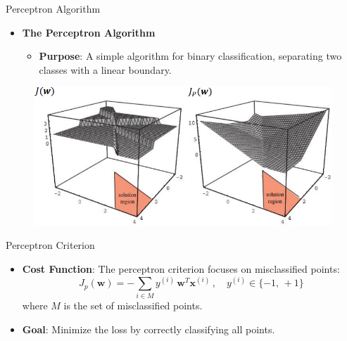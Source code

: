 \documentclass[serif, aspectratio=169]{beamer}
\begin{document}
\begin{frame}{Perceptron Algorithm}
    \begin{itemize}
        \item \textbf{The Perceptron Algorithm}
        \medskip
        \begin{itemize}\itemsep1em
            \item \justifying \textbf{Purpose}:
            A simple algorithm for binary classification, separating two classes with a linear boundary.
        \end{itemize}
    \end{itemize}
    \begin{figure}
        \centering
        \includegraphics[width=0.7\linewidth]{pic/Figure_13.png}
    \end{figure}
    \vfill
\end{frame}


\begin{frame}{Perceptron Criterion}
    \begin{itemize}\itemsep1.2em
        \item \textbf{Cost Function}:
        The perceptron criterion focuses on misclassified points:
        \[
        J_p(\mathbf{w}) = - \sum_{i \in M} y^{(i)} \, \mathbf{w}^T \mathbf{x}^{(i)} \, , \quad y^{(i)} \in \{-1, \, +1\}
        \]
        where \( M \) is the set of misclassified points.
        \item \textbf{Goal}:
        Minimize the loss by correctly classifying all points.
    \end{itemize}
\end{frame}
\end{document}
